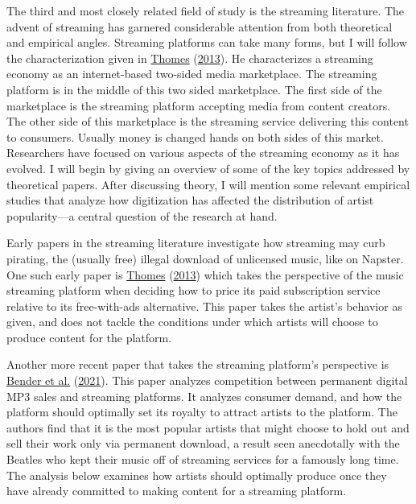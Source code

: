 \documentclass[
]{article}
\begin{document}
The third and most closely related field of study is the streaming
literature. The advent of streaming has garnered considerable attention
from both theoretical and empirical angles. Streaming platforms can take
many forms, but I will follow the characterization given in
\protect\hyperlink{ref-thomesEconomicAnalysisOnline2013}{Thomes}
(\protect\hyperlink{ref-thomesEconomicAnalysisOnline2013}{2013}). He
characterizes a streaming economy as an internet-based two-sided media
marketplace. The streaming platform is in the middle of this two sided
marketplace. The first side of the marketplace is the streaming platform
accepting media from content creators. The other side of this
marketplace is the streaming service delivering this content to
consumers. Usually money is changed hands on both sides of this market.
Researchers have focused on various aspects of the streaming economy as
it has evolved. I will begin by giving an overview of some of the key
topics addressed by theoretical papers. After discussing theory, I will
mention some relevant empirical studies that analyze how digitization
has affected the distribution of artist popularity---a central question
of the research at hand.

Early papers in the streaming literature investigate how streaming may
curb pirating, the (usually free) illegal download of unlicensed music,
like on Napster. One such early paper is
\protect\hyperlink{ref-thomesEconomicAnalysisOnline2013}{Thomes}
(\protect\hyperlink{ref-thomesEconomicAnalysisOnline2013}{2013}) which
takes the perspective of the music streaming platform when deciding how
to price its paid subscription service relative to its free-with-ads
alternative. This paper takes the artist's behavior as given, and does
not tackle the conditions under which artists will choose to produce
content for the platform.

Another more recent paper that takes the streaming platform's
perspective is
\protect\hyperlink{ref-benderAttractingArtistsMusic2021}{Bender et al.}
(\protect\hyperlink{ref-benderAttractingArtistsMusic2021}{2021}). This
paper analyzes competition between permanent digital MP3 sales and
streaming platforms. It analyzes consumer demand, and how the platform
should optimally set its royalty to attract artists to the platform. The
authors find that it is the most popular artists that might choose to
hold out and sell their work only via permanent download, a result seen
anecdotally with the Beatles who kept their music off of streaming
services for a famously long time. The analysis below examines how
artists should optimally produce once they have already committed to
making content for a streaming platform.
\end{document}
